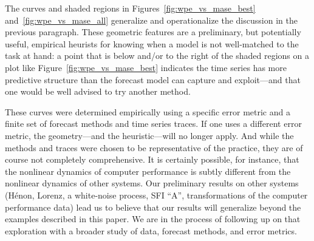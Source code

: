 The curves and shaded regions in Figures~\ref{fig:wpe_vs_mase_best}
and~\ref{fig:wpe_vs_mase_all} generalize and operationalize the
discussion in the previous paragraph.  These geometric features are a
preliminary, but potentially useful, empirical heurists for knowing
when a model is not well-matched to the task at hand: a point that is
below and/or to the right of the shaded regions on a plot like
Figure~\ref{fig:wpe_vs_mase_best} indicates the time series has more
predictive structure than the forecast model can capture and
exploit---and that one would be well advised to try another method.

These curves were determined empirically using a specific error metric
and a finite set of forecast methods and time series traces.  If one
uses a different error metric, the geometry---and the heuristic---will
no longer apply.  And while the methods and traces were chosen to be
representative of the practice, they are of course not completely
comprehensive.  It is certainly possible, for instance, that the
nonlinear dynamics of computer performance is subtly different from
the nonlinear dynamics of other systems.  Our preliminary results on
other systems (H\'enon, Lorenz, a white-noise process, SFI ``A'',
transformations of the computer performance data) lead us to believe
that our results will generalize beyond the examples described in this
paper.  We are in the process of following up on that exploration with
a broader study of data, forecast methods, and error metrics.

% 


